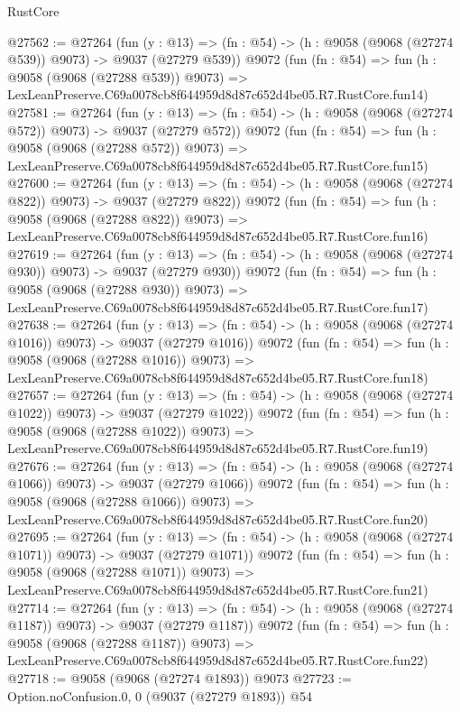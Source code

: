 \begin{lexlean}{RustCore}
\begin{coremodule}
@27562 := @27264
    (fun (y : @13) => (fn : @54) -> (h : @9058 (@9068 (@27274 @539)) @9073) -> @9037 (@27279 @539))
    @9072
    (fun (fn : @54) =>
    fun (h : @9058 (@9068 (@27288 @539)) @9073) =>
    LexLeanPreserve.C69a0078cb8f644959d8d87c652d4be05.R7.RustCore.fun14)
@27581 := @27264
    (fun (y : @13) => (fn : @54) -> (h : @9058 (@9068 (@27274 @572)) @9073) -> @9037 (@27279 @572))
    @9072
    (fun (fn : @54) =>
    fun (h : @9058 (@9068 (@27288 @572)) @9073) =>
    LexLeanPreserve.C69a0078cb8f644959d8d87c652d4be05.R7.RustCore.fun15)
@27600 := @27264
    (fun (y : @13) => (fn : @54) -> (h : @9058 (@9068 (@27274 @822)) @9073) -> @9037 (@27279 @822))
    @9072
    (fun (fn : @54) =>
    fun (h : @9058 (@9068 (@27288 @822)) @9073) =>
    LexLeanPreserve.C69a0078cb8f644959d8d87c652d4be05.R7.RustCore.fun16)
@27619 := @27264
    (fun (y : @13) => (fn : @54) -> (h : @9058 (@9068 (@27274 @930)) @9073) -> @9037 (@27279 @930))
    @9072
    (fun (fn : @54) =>
    fun (h : @9058 (@9068 (@27288 @930)) @9073) =>
    LexLeanPreserve.C69a0078cb8f644959d8d87c652d4be05.R7.RustCore.fun17)
@27638 := @27264
    (fun (y : @13) =>
    (fn : @54) -> (h : @9058 (@9068 (@27274 @1016)) @9073) -> @9037 (@27279 @1016))
    @9072
    (fun (fn : @54) =>
    fun (h : @9058 (@9068 (@27288 @1016)) @9073) =>
    LexLeanPreserve.C69a0078cb8f644959d8d87c652d4be05.R7.RustCore.fun18)
@27657 := @27264
    (fun (y : @13) =>
    (fn : @54) -> (h : @9058 (@9068 (@27274 @1022)) @9073) -> @9037 (@27279 @1022))
    @9072
    (fun (fn : @54) =>
    fun (h : @9058 (@9068 (@27288 @1022)) @9073) =>
    LexLeanPreserve.C69a0078cb8f644959d8d87c652d4be05.R7.RustCore.fun19)
@27676 := @27264
    (fun (y : @13) =>
    (fn : @54) -> (h : @9058 (@9068 (@27274 @1066)) @9073) -> @9037 (@27279 @1066))
    @9072
    (fun (fn : @54) =>
    fun (h : @9058 (@9068 (@27288 @1066)) @9073) =>
    LexLeanPreserve.C69a0078cb8f644959d8d87c652d4be05.R7.RustCore.fun20)
@27695 := @27264
    (fun (y : @13) =>
    (fn : @54) -> (h : @9058 (@9068 (@27274 @1071)) @9073) -> @9037 (@27279 @1071))
    @9072
    (fun (fn : @54) =>
    fun (h : @9058 (@9068 (@27288 @1071)) @9073) =>
    LexLeanPreserve.C69a0078cb8f644959d8d87c652d4be05.R7.RustCore.fun21)
@27714 := @27264
    (fun (y : @13) =>
    (fn : @54) -> (h : @9058 (@9068 (@27274 @1187)) @9073) -> @9037 (@27279 @1187))
    @9072
    (fun (fn : @54) =>
    fun (h : @9058 (@9068 (@27288 @1187)) @9073) =>
    LexLeanPreserve.C69a0078cb8f644959d8d87c652d4be05.R7.RustCore.fun22)
@27718 := @9058 (@9068 (@27274 @1893)) @9073
@27723 := Option.noConfusion.{0, 0} (@9037 (@27279 @1893)) @54

\end{coremodule}
\end{lexlean}
